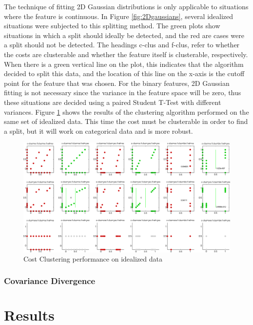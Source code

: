 \documentclass[12pt]{article}
\begin{document}
The technique of fitting 2D Gaussian distributions is only applicable to situations where the feature is continuous. In Figure \ref{fig:2Dgaussians}, several idealized situations were subjected to this splitting method. The green plots show situations in which a split should ideally be detected, and the red are cases were a split should not be detected. The headings c-clus and f-clus, refer to whether the costs are clusterable and whether the feature itself is clusterable, respectively. When there is a green vertical line on the plot, this indicates that the algorithm decided to split this data, and the location of this line on the x-axis is the cutoff point for the feature that was chosen. For the binary features, 2D Gaussian fitting is not necessary since the variance in the feature space will be zero, thus these situations are decided using a paired Student T-Test with different variances. Figure \ref{fig:clustercosts} shows the results of the clustering algorithm performed on the same set of idealized data. This time the cost must be clusterable in order to find a split, but it will work on categorical data and is more robust. 


\begin{figure}[ht]
  \centerline{
  \includegraphics[width=1.0\columnwidth]{cluster_costs.png}}
  \caption{\label{fig_cluster_costs} Cost Clustering performance on idealized data}
  \label{fig:clustercosts}
\end{figure}

\subsubsection{Covariance Divergence}


\section{Results}
\end{document}
